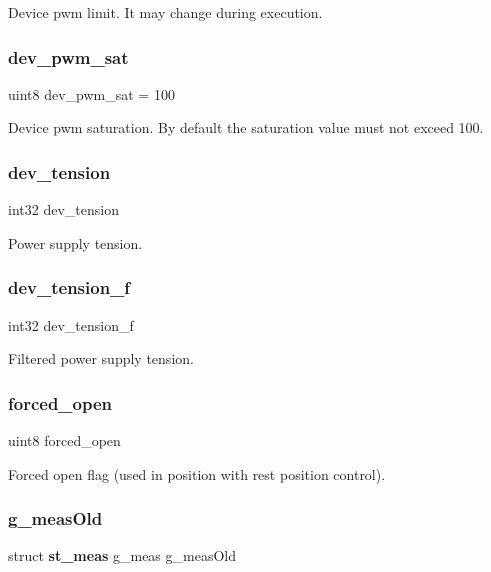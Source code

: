 Device pwm limit. It may change during execution. \mbox{\label{globals_8c_ad5c7a08c9d0e804a0db2d6f169976a13}} 
\subsubsection{dev\+\_\+pwm\+\_\+sat}
{\footnotesize\ttfamily uint8 dev\+\_\+pwm\+\_\+sat = 100}

Device pwm saturation. By default the saturation value must not exceed 100. \mbox{\label{globals_8c_a53a494e9edc739a4f7c884778d1a93b1}} 
\subsubsection{dev\+\_\+tension}
{\footnotesize\ttfamily int32 dev\+\_\+tension}

Power supply tension. \mbox{\label{globals_8c_a600f1f02d397d3ffd8b03b8a4edace02}} 
\subsubsection{dev\+\_\+tension\+\_\+f}
{\footnotesize\ttfamily int32 dev\+\_\+tension\+\_\+f}

Filtered power supply tension. \mbox{\label{globals_8c_a0f13b80a0c329fa3176eb1e72ef36fb8}} 
\subsubsection{forced\+\_\+open}
{\footnotesize\ttfamily uint8 forced\+\_\+open}

Forced open flag (used in position with rest position control). \mbox{\label{globals_8c_a47c3980e6bddec492ca4315e36602ba0}} 
\subsubsection{g\+\_\+meas\+Old}
{\footnotesize\ttfamily struct \textbf{ st\+\_\+meas} g\+\_\+meas g\+\_\+meas\+Old}

